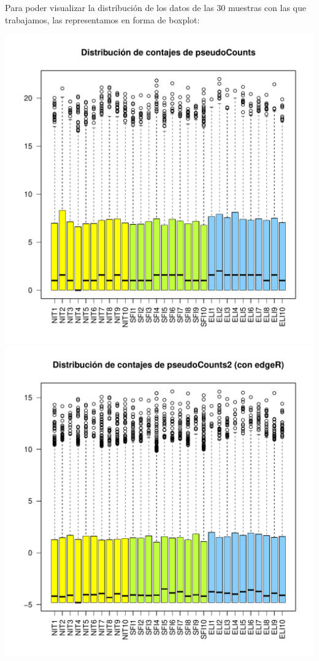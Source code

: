 \documentclass[
  english,
]{article}
\begin{document}
Para poder visualizar la distribución de los datos de las 30 muestras
con las que trabajamos, las representamos en forma de boxplot:

\includegraphics{ortega_rita_ADO_PEC2_files/figure-latex/boxplot rawdata pseudocounts-1.pdf}
\includegraphics{ortega_rita_ADO_PEC2_files/figure-latex/boxplot rawdata pseudocounts2-1.pdf}
\end{document}
